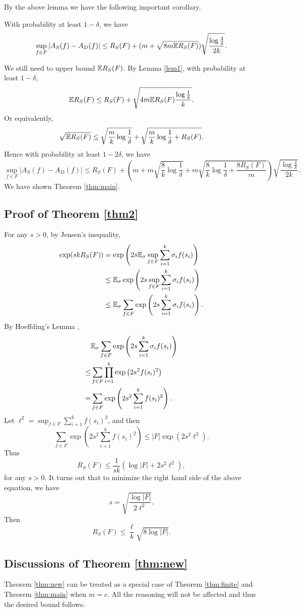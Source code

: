 By the above lemma we have the following important corollary.
\begin{corollary}
With probability at least $1-\delta$, we have
$$\sup_{f\in F}|A_S(f) - A_D(f)| \leq R_S(F) + (m+\sqrt{8m \mathbb{E} R_S(F)})\sqrt{\frac{\log \frac{4}{\delta}}{2k}}.$$
\end{corollary}

We still need to upper bound $\mathbb{E} R_S(F)$. By Lemma \ref{lem1}, with probability at least $1-\delta$,
$$\mathbb{E} R_S(F) \leq R_S(F) + \sqrt{4m\mathbb{E} R_S(F)\frac{\log \frac{1}{\delta}}{k}}.$$
Or equivalently,
$$\sqrt{\mathbb{E} R_S(F)} \leq \sqrt{\frac{m}{k}\log \frac{1}{\delta}} + \sqrt{\frac{m}{k}\log \frac{1}{\delta} + R_S(F)}.$$
Hence with probability at least $1-2\delta$, we have
$$\sup_{f\in F}|A_S(f) - A_D(f)| \leq R_S(F) + \left(m+m\sqrt{\frac{8}{k}\log \frac{1}{\delta}} + m\sqrt{\frac{8}{k}\log \frac{1}{\delta} + \frac{8R_S(F)}{m}}\right)\sqrt{\frac{\log \frac{4}{\delta}}{2k}}.$$
We have shown Theorem \ref{thm:main}.


\subsection{Proof of Theorem \ref{thm2}}
For any $s>0$, by Jensen's inequality,
$$\begin{aligned}
\exp(skR_S(F)) & = \exp\left(2s\mathbb{E}_\sigma \sup_{f\in F} \sum_{i=1}^k \sigma_i f(s_i)\right) \\
&\leq \mathbb{E}_\sigma \exp\left(2s \sup_{f\in F} \sum_{i=1}^k \sigma_i f(s_i)\right) \\
&\leq \mathbb{E}_\sigma \sum_{f\in F} \exp\left(2s\sum_{i=1}^k \sigma_i f(s_i)\right).
\end{aligned}$$
By Hoeffding's Lemma \cite{H63},
$$\begin{aligned}
&\mathbb{E}_\sigma \sum_{f\in F} \exp\left(2s\sum_{i=1}^k \sigma_i f(s_i)\right) \\
\leq & \sum_{f\in F}\prod_{i=1}^k \exp\left(2s^2f(s_i)^2\right) \\
=& \sum_{f\in F} \exp\left(2s^2\sum_{i=1}^k f(s_i)^2\right).
\end{aligned}$$
Let $\ell^2 = \sup_{f\in F}\sum_{i=1}^k f(s_i)^2$, and then
$$\sum_{f\in F} \exp\left(2s^2\sum_{i=1}^k f(s_i)^2\right) \leq |F| \exp\left(2s^2\ell^2\right).$$
Thus
$$R_S(F) \leq \frac{1}{sk}(\log|F| + 2s^2\ell^2),$$
for any $s>0$. It turns out that to minimize the right hand side of the above equation, we have
$$s = \sqrt{\frac{\log|F|}{2\ell^2}}.$$
Then
$$R_S(F) \leq \frac{\ell}{k}\sqrt{8\log |F|}.$$ 


\subsection{Discussions of Theorem \ref{thm:new}}
Theorem \ref{thm:new} can be treated as a special case of Theorem \ref{thm:finite} and Theorem \ref{thm:main} when $m=c$. All the reasoning will not be affected and thus the desired bound follows.